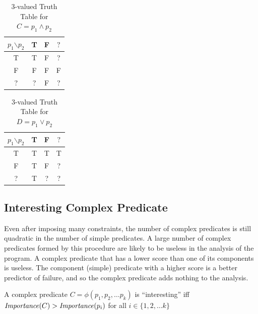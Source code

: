 \begin{table}
\caption{3-valued Truth Table for $C = p_1 \wedge p_2$}
\label{tab:and}
\centering
\scriptsize

\begin{tabular}{c|ccc}
  $p_1$$\backslash$$p_2$ & T & F & $?$ \\
  \hline
  T & T & F & ? \\
  F & F & F & F \\
  ? & ? & F & ? \\
\end{tabular}
\end{table}


\begin{table}
\caption{3-valued Truth Table for $D = p_1 \vee p_2$}
\label{tab:or}
\centering
\scriptsize

  \centering
  \begin{tabular}{c|ccc}
  $p_1$$\backslash$$p_2$ & T & F & $?$ \\
  \hline
  T & T & T & T \\
  F & T & F & ? \\
  ? & T & ? & ? \\
\end{tabular}
\end{table}

\subsection{Interesting Complex Predicate}

Even after imposing many constraints, the number of complex predicates is still quadratic in the number of simple predicates.  A large number of complex predicates formed by this procedure are likely to be useless in the analysis of the program.  A complex predicate that has a lower score than one of its components is useless.  The component (simple) predicate with a higher score is a better predictor of failure, and so the complex predicate adds nothing to the analysis.

\begin{defn}
\label{dfn3}
A complex predicate $C = \phi(p_1, p_2, \ldots p_k)$ is ``interesting'' iff $\mathit{Importance}(C) > \mathit{Importance}(p_i)$ for all $i \in \{1, 2, \ldots k\}$
\end{defn}

